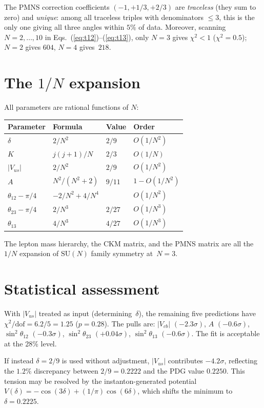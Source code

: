 \documentclass[aps,prl,twocolumn,showpacs,preprintnumbers]{revtex4-2}
\newcommand{\SU}{\mathrm{SU}}
\begin{document}
The PMNS correction coefficients $(-1, +1/3, +2/3)$ are
\emph{traceless} (they sum to zero) and \emph{unique}:
among all traceless triples with denominators $\leq 3$,
this is the only one giving all three angles within $5\%$
of data. Moreover, scanning~$N = 2,\ldots,10$ in
Eqs.~(\ref{eq:t12})--(\ref{eq:t13}), only $N = 3$ gives
$\chi^2 < 1$ ($\chi^2 = 0.5$); $N = 2$ gives $604$, $N = 4$
gives~$218$.


\section{The $1/N$ expansion}

All parameters are rational functions of $N$:
\begin{center}
\begin{tabular}{llll}
\hline
Parameter & Formula & Value & Order \\
\hline
$\delta$ & $2/N^2$ & $2/9$ & $O(1/N^2)$ \\
$K$ & $j(j{+}1)/N$ & $2/3$ & $O(1/N)$ \\
$|V_{us}|$ & $2/N^2$ & $2/9$ & $O(1/N^2)$ \\
$A$ & $N^2/(N^2{+}2)$ & $9/11$ & $1{-}O(1/N^2)$ \\
$\theta_{12}{-}\pi/4$ & $-2/N^2{+}4/N^4$ & & $O(1/N^2)$ \\
$\theta_{23}{-}\pi/4$ & $2/N^3$ & $2/27$ & $O(1/N^3)$ \\
$\theta_{13}$ & $4/N^3$ & $4/27$ & $O(1/N^3)$ \\
\hline
\end{tabular}
\end{center}

The lepton mass hierarchy, the CKM matrix, and the PMNS matrix
are all the $1/N$ expansion of $\SU(N)$ family symmetry at~$N = 3$.


\section{Statistical assessment}

With $|V_{us}|$ treated as input (determining~$\delta$),
the remaining five predictions have
$\chi^2/\mathrm{dof} = 6.2/5 = 1.25$ ($p = 0.28$).
The pulls are: $|V_{cb}|$ $(-2.3\sigma)$,
$A$ $(-0.6\sigma)$,
$\sin^2\theta_{12}$ $(-0.3\sigma)$,
$\sin^2\theta_{23}$ $(+0.04\sigma)$,
$\sin^2\theta_{13}$ $(-0.6\sigma)$.
The fit is acceptable at the 28\% level.

If instead $\delta = 2/9$ is used without adjustment,
$|V_{us}|$ contributes $-4.2\sigma$, reflecting the $1.2\%$
discrepancy between $2/9 = 0.2222$ and the PDG value $0.2250$.
This tension may be resolved by the instanton-generated
potential $V(\delta) = -\cos(3\delta) + (1/\pi)\cos(6\delta)$,
which shifts the minimum to $\delta = 0.2225$.
\end{document}
